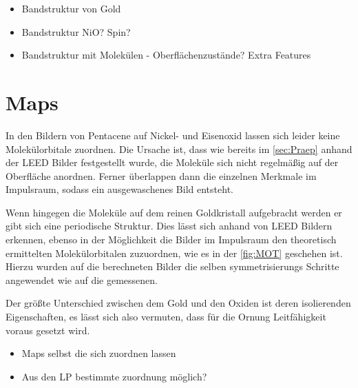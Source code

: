         \begin{itemize}
            \item Bandstruktur von Gold
            \item Bandstruktur NiO? Spin?
            \item Bandstruktur mit Molekülen - Oberflächenzustände? Extra Features
        \end{itemize}

    \section{Maps}
        In den Bildern von Pentacene auf Nickel- und Eisenoxid lassen sich leider keine Molekülorbitale zuordnen.
        Die Ursache ist, dass wie bereits im \autoref{sec:Praep} anhand der LEED Bilder festgestellt wurde, die Moleküle sich nicht regelmäßig auf der Oberfläche anordnen.
        Ferner überlappen dann die einzelnen Merkmale im Impulsraum, sodass ein ausgewaschenes Bild entsteht.

        Wenn hingegen die Moleküle auf dem reinen Goldkristall aufgebracht werden er gibt sich eine periodische Struktur.
        Dies lässt sich anhand von LEED Bildern erkennen, ebenso in der Möglichkeit die Bilder im Impulsraum den theoretisch ermittelten Molekülorbitalen zuzuordnen, wie es in der \autoref{fig:MOT} geschehen ist.
        Hierzu wurden auf die berechneten Bilder die selben symmetrisierungs Schritte angewendet wie auf die gemessenen.

        Der größte Unterschied zwischen dem Gold und den Oxiden ist deren isolierenden Eigenschaften, es lässt sich also vermuten, dass für die Ornung Leitfähigkeit voraus gesetzt wird.


        \begin{itemize}
            \item Maps selbst die sich zuordnen lassen
            \item Aus den LP bestimmte zuordnung möglich?
        \end{itemize}


